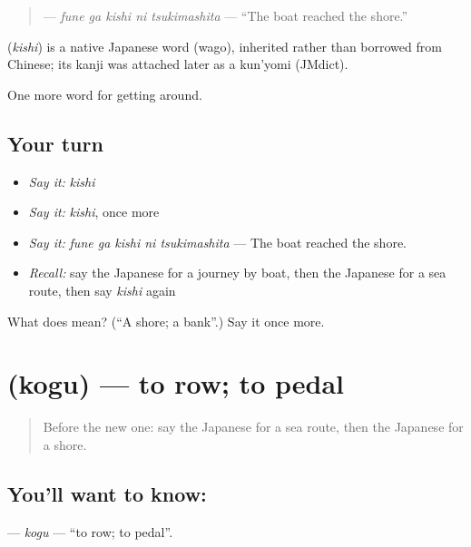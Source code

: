 \begin{quote}
\textbf{  } — \emph{fune ga kishi ni tsukimashita} — \textquotedblleft{}The boat reached the shore.\textquotedblright{}
\end{quote}

\begin{cousinweb}
\textbf{} (\emph{kishi}) is a native Japanese word (wago), inherited rather than borrowed from Chinese; its kanji was attached later as a kun'yomi (JMdict).
\end{cousinweb}

\begin{grammarlens}[title={What you've built}]
One more word for getting around.
\end{grammarlens}

\subsection*{Your turn}
\begin{itemize}
\raggedright
  \item \emph{Say it:} \emph{kishi}
  \item \emph{Say it:} \emph{kishi}, once more
  \item \emph{Say it:} \emph{fune ga kishi ni tsukimashita} — The boat reached the shore.
  \item \emph{Recall:} say the Japanese for a journey by boat, then the Japanese for a sea route, then say \emph{kishi} again
\end{itemize}

\begin{tcolorbox}[breakable,colback=teal!4,colframe=teal!35!black,title={Before you move on}]
What does  mean? (\textquotedblleft{}A shore; a bank\textquotedblright{}.) Say it once more.
\end{tcolorbox}
\section[\texorpdfstring{\ja{こぐ} (kogu)}{こぐ (kogu)}]{ (kogu) — to row; to pedal}

\label{lesson:JA-C381-kogu}



\begin{quote}
Before the new one: say the Japanese for a sea route, then the Japanese for a shore.
\end{quote}

\subsection*{You'll want to know: }
\textbf{} — \emph{kogu} — \textquotedblleft{}to row; to pedal\textquotedblright{}.

